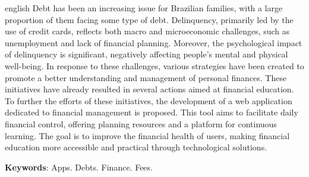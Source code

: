 \begin{resumo}[Abstract]
	\SingleSpacing
	\begin{otherlanguage*}{english}
		Debt has been an increasing issue for Brazilian families, with a large proportion of them facing some type of debt. Delinquency, primarily led by the use of credit cards, reflects both macro and microeconomic challenges, such as unemployment and lack of financial planning. Moreover, the psychological impact of delinquency is significant, negatively affecting people's mental and physical well-being. In response to these challenges, various strategies have been created to promote a better understanding and management of personal finances. These initiatives have already resulted in several actions aimed at financial education. To further the efforts of these initiatives, the development of a web application dedicated to financial management is proposed. This tool aims to facilitate daily financial control, offering planning resources and a platform for continuous learning. The goal is to improve the financial health of users, making financial education more accessible and practical through technological solutions.
		
		\textbf{Keywords}: Apps. Debts. Finance. Fees.
	\end{otherlanguage*}
\end{resumo}

% 
%
%  

	\listoffigures*
	\cleardoublepage
	
	
	\listoftables*
	\cleardoublepage
	
	
	
{
	\tableofcontents*
	\cleardoublepage
}	
